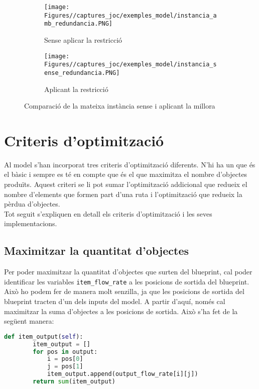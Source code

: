 \begin{figure}[H]
    \centering
    \begin{subfigure}{0.45\textwidth}
        \texttt{[image: Figures//captures\_joc/exemples\_model/instancia\_amb\_redundancia.PNG]}
        \caption{Sense aplicar la restricció}
    \end{subfigure}
    \hfill
    \begin{subfigure}{0.45\textwidth}
        \texttt{[image: Figures//captures\_joc/exemples\_model/instancia\_sense\_redundancia.PNG]}
        \caption{Aplicant la restricció}
    \end{subfigure}
    \caption{Comparació de la mateixa instància sense i aplicant la millora}
\end{figure}

\section{Criteris d'optimització}
Al model s'han incorporat tres criteris d'optimització diferents. N'hi ha un que és el bàsic i sempre es té en compte que és el que maximitza el nombre d'objectes produïts. Aquest criteri se li pot sumar l'optimització addicional que redueix el nombre d'elements que formen part d'una ruta i l'optimització que redueix la pèrdua d'objectes.\\
Tot seguit s'expliquen en detall els criteris d'optimització i les seves implementacions.

\subsection{Maximitzar la quantitat d'objectes}
Per poder maximitzar la quantitat d'objectes que surten del blueprint, cal poder identificar les variables \lstinline{item_flow_rate} a les posicions de sortida del blueprint. Això ho podem fer de manera molt senzilla, ja que les posicions de sortida del blueprint tracten d'un dels inputs del model. A partir d'aquí, només cal maximitzar la suma d'objectes a les posicions de sortida. Això s'ha fet de la següent manera:
\begin{lstlisting}[language=Python, caption=Quantitat d'objectes de sortida]
    def item_output(self):
        item_output = []
        for pos in output:
            i = pos[0]
            j = pos[1]
            item_output.append(output_flow_rate[i][j])
        return sum(item_output)
\end{lstlisting}

